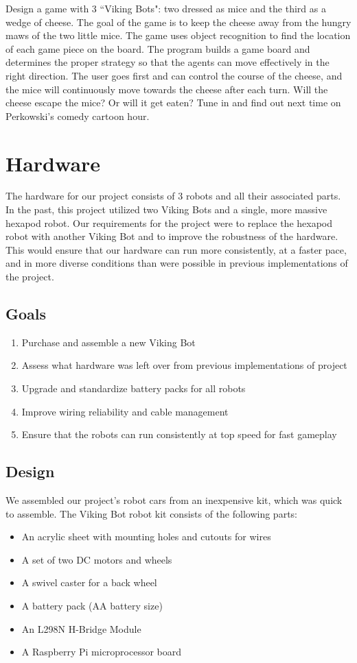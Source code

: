 \documentclass[a4paper,12pt]{article}
\begin{document}
	Design a game with 3 ``Viking Bots": two dressed as mice and the third as a wedge of cheese. The goal of the game is to keep the cheese away from the hungry maws of the two little mice. The game uses object recognition to find the location of each game piece on the board. The program builds a game board and determines the proper strategy so that the agents can move effectively in the right direction. The user goes first and can control the course of the cheese, and the mice will continuously move towards the cheese after each turn. Will the cheese escape the mice? Or will it get eaten? Tune in and find out next time on Perkowski’s comedy cartoon hour.

\section{Hardware}
	The hardware for our project consists of 3 robots and all their associated parts. In the past, this project utilized two Viking Bots and a single, more massive hexapod robot. Our requirements for the project were to replace the hexapod robot with another Viking Bot and to improve the robustness of the hardware. This would ensure that our hardware can run more consistently, at a faster pace, and in more diverse conditions than were possible in previous implementations of the project.

\subsection{Goals}
	\begin{enumerate}
		\item Purchase and assemble a new Viking Bot
		\item Assess what hardware was left over from previous implementations of project
		\item Upgrade and standardize battery packs for all robots
		\item Improve wiring reliability and cable management
		\item Ensure that the robots can run consistently at top speed for fast gameplay	
	\end{enumerate}

\subsection{Design}
	We assembled our project’s robot cars from an inexpensive kit, which was quick to assemble.  The Viking Bot robot kit consists of the following parts: 
	\begin{itemize}
		\item An acrylic sheet with mounting holes and cutouts for wires
		\item A set of two DC motors and wheels
		\item A swivel caster for a back wheel
		\item A battery pack (AA battery size)
		\item An L298N H-Bridge Module
		\item A Raspberry Pi microprocessor board
	\end{itemize}
\end{document}
